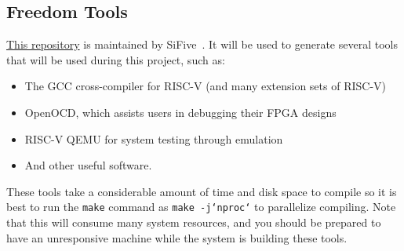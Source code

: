 \subsection{Freedom Tools}\label{sec:Freedom_Tools}
\href{https://github.com/sifive/freedom-tools}{This repository} is maintained by SiFive~\cite{freedomTools}.
It will be used to generate several tools that will be used during this project, such as:
\begin{itemize}
\item The GCC cross-compiler for RISC-V (and many extension sets of RISC-V)
\item OpenOCD, which assists users in debugging their FPGA designs
\item RISC-V QEMU for system testing through emulation
\item And other useful software.
\end{itemize}

These tools take a considerable amount of time and disk space to compile so it is best to run the \texttt{make} command as \texttt{make -j`nproc`} to parallelize compiling.
Note that this will consume many system resources, and you should be prepared to have an unresponsive machine while the system is building these tools.

